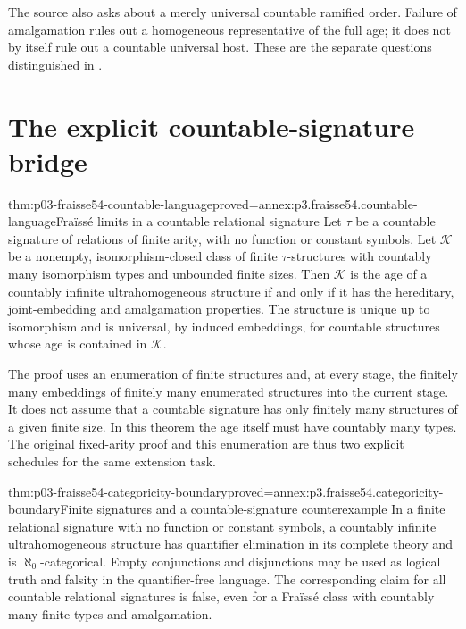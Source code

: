 The source also asks about a merely universal countable ramified order.
Failure of amalgamation rules out a homogeneous representative of the full
age; it does not by itself rule out a countable universal host. These are
the separate questions distinguished in \cite[\S\S4.7, 9.5]{Fraisse1954}.

\section{The explicit countable-signature bridge}
\label{sec:p03-fraisse54-modern}

\begin{hbtheorem}{thm:p03-fraisse54-countable-language}{proved=annex:p3.fraisse54.countable-language}{Fra\"iss\'e limits in a countable relational signature}
Let \(\tau\) be a countable signature of relations of finite arity, with
no function or constant symbols. Let \(\mathcal K\) be a nonempty,
isomorphism-closed class of finite \(\tau\)-structures with countably many
isomorphism types and unbounded finite sizes. Then \(\mathcal K\) is the
age of a countably infinite ultrahomogeneous structure if and only if it
has the hereditary, joint-embedding and amalgamation properties.
The structure is unique up to isomorphism and is universal, by induced
embeddings, for countable structures whose age is contained in \(\mathcal K\).
\end{hbtheorem}

The proof uses an enumeration of finite structures and, at every stage,
the finitely many embeddings of finitely many enumerated structures into
the current stage. It does not assume that a countable signature has only
finitely many structures of a given finite size. In this theorem the age
itself must have countably many types. The original fixed-arity proof and
this enumeration are thus two explicit schedules for the same extension task.

\begin{hbtheorem}{thm:p03-fraisse54-categoricity-boundary}{proved=annex:p3.fraisse54.categoricity-boundary}{Finite signatures and a countable-signature counterexample}
In a finite relational signature with no function or constant symbols,
a countably infinite ultrahomogeneous
structure has quantifier elimination in its complete theory and is
\(\aleph_0\)-categorical. Empty conjunctions and disjunctions may be used
as logical truth and falsity in the quantifier-free language.
The corresponding claim for all countable relational signatures is false,
even for a Fra\"iss\'e class with countably many finite types and amalgamation.
\end{hbtheorem}

